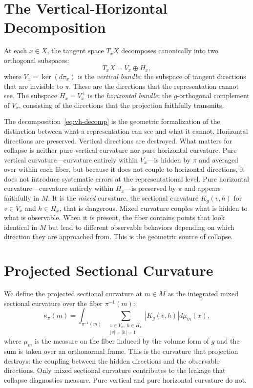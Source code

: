 \documentclass[12pt, oneside]{book}
\theoremstyle{plain-flyxion}
\theoremstyle{definition-flyxion}
\newcommand{\kpi}{\kappa_{\pi}}
\begin{document}
\section{The Vertical-Horizontal Decomposition}

At each $x\in X$, the tangent space $T_xX$ decomposes canonically into two orthogonal
subspaces:
\begin{equation}\label{eq:vh-decomp}
T_xX = V_x \oplus H_x,
\end{equation}
where $V_x = \ker(d\pi_x)$ is the \emph{vertical bundle}: the subspace of tangent
directions that are invisible to $\pi$. These are the directions that the representation
cannot see. The subspace $H_x = V_x^\perp$ is the \emph{horizontal bundle}: the
$g$-orthogonal complement of $V_x$, consisting of the directions that the projection
faithfully transmits.

The decomposition~\eqref{eq:vh-decomp} is the geometric formalization of the distinction
between what a representation can see and what it cannot. Horizontal directions are
preserved. Vertical directions are destroyed. What matters for collapse is neither pure
vertical curvature nor pure horizontal curvature. Pure vertical curvature---curvature
entirely within $V_x$---is hidden by $\pi$ and averaged over within each fiber, but
because it does not couple to horizontal directions, it does not introduce systematic
errors at the representational level. Pure horizontal curvature---curvature entirely
within $H_x$---is preserved by $\pi$ and appears faithfully in $M$. It is the
\emph{mixed} curvature, the sectional curvature $K_g(v,h)$ for $v\in V_x$ and $h\in
H_x$, that is dangerous. Mixed curvature couples what is hidden to what is observable.
When it is present, the fiber contains points that look identical in $M$ but lead to
different observable behaviors depending on which direction they are approached from.
This is the geometric source of collapse.

\section{Projected Sectional Curvature}

We define the projected sectional curvature at $m\in M$ as the integrated mixed sectional
curvature over the fiber $\pi^{-1}(m)$:
\begin{equation}\label{eq:kpi}
\kpi(m) = \int_{\pi^{-1}(m)}
  \sum_{\substack{v\in V_x,\; h\in H_x \\ |v|=|h|=1}}
  \left|K_g(v,h)\right| d\mu_m(x),
\end{equation}
where $\mu_m$ is the measure on the fiber induced by the volume form of $g$ and the sum
is taken over an orthonormal frame. This is the curvature that projection destroys: the
coupling between the hidden directions and the observable directions. Only mixed sectional
curvature contributes to the leakage that collapse diagnostics measure. Pure vertical and
pure horizontal curvature do not.
\end{document}
